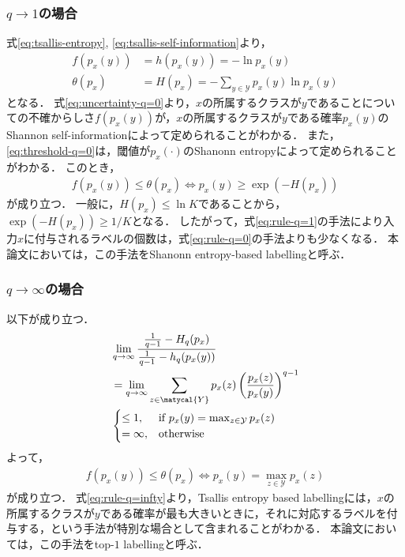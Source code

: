 \documentclass[a4paper,conference]{IEEEtran}
\begin{document}
\subsubsection{$q \rightarrow 1$の場合}
式\eqref{eq:tsallis-entropy}, \eqref{eq:tsallis-self-information}より，
\begin{align}
    f(p_{x}(y)) &= h(p_{x}(y)) = - \ln p_{x}(y)\label{eq:uncertainty-q=1}\\
    \theta(p_{x}) &= H(p_{x}) = - \sum_{y \in \mathcal{Y}} p_{x}(y) \ln p_{x}(y)\label{eq:threshold-q=1}
\end{align}
となる．
式\eqref{eq:uncertainty-q=0}より，$x$の所属するクラスが$y$であることについての不確からしさ$f(p_{x}(y))$が，$x$の所属するクラスが$y$である確率$p_{x}(y)$のShannon self-informationによって定められることがわかる．
また，\eqref{eq:threshold-q=0}は，閾値が$p_{x}(\cdot)$のShanonn entropyによって定められることがわかる．
このとき，
\begin{align}
    f(p_{x}(y)) \le \theta(p_{x}) \Leftrightarrow p_{x}(y) \ge \exp(-H(p_{x}))\label{eq:rule-q=1}
\end{align}
が成り立つ．
一般に，$H(p_{x}) \le \ln K$であることから，$\exp(-H(p_{x})) \ge 1/K$となる．
したがって，式\eqref{eq:rule-q=1}の手法により入力$x$に付与されるラベルの個数は，式\eqref{eq:rule-q=0}の手法よりも少なくなる．
本論文においては，この手法をShanonn entropy-based labellingと呼ぶ．

\subsubsection{$q \rightarrow \infty$の場合}
以下が成り立つ．
\begin{align}
    &\lim_{q \rightarrow \infty} \frac{\frac{1}{q-1}-H_{q}(p_{x})}{\frac{1}{q-1}-h_{q}(p_{x}(y))}\nonumber\\
    &=\lim_{q \rightarrow \infty} \sum_{z \in \matycal{Y}} p_{x}(z) \left(\frac{p_{x}(z)}{p_{x}(y)}\right)^{q-1}\nonumber\\
    &
    \begin{cases}
    \le 1, & \text{if~}p_{x}(y) = \max_{z\in\mathcal{Y}}p_{x}(z)\\
    = \infty, & \text{otherwise}
    \end{cases}
\end{align}
よって，
\begin{align}
    f(p_{x}(y)) \le \theta(p_{x}) \Leftrightarrow p_{x}(y) = \max_{z \in \mathcal{Y}}p_{x}(z)\label{eq:rule-q=infty}
\end{align}
が成り立つ．
式\eqref{eq:rule-q=infty}より，Tsallis entropy based labellingには，$x$の所属するクラスが$y$である確率が最も大きいときに，それに対応するラベルを付与する，という手法が特別な場合として含まれることがわかる．
本論文においては，この手法をtop-$1$ labellingと呼ぶ．
\end{document}
